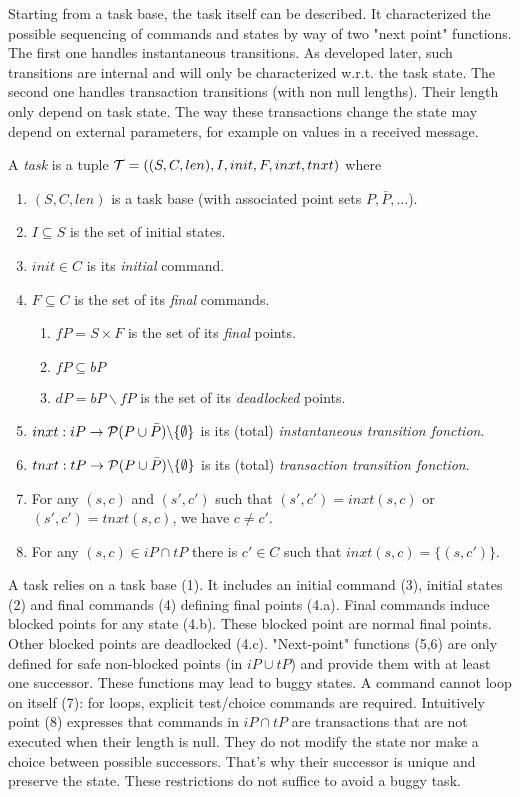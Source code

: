 \documentclass{article}
\begin{document}
Starting from a task base, the task itself can be described. It characterized the possible sequencing of commands and states by way of two "next point" functions. The first one handles instantaneous transitions. As developed later, such transitions are internal and will only be characterized w.r.t. the task state. The second one handles transaction transitions (with non null lengths). Their length only depend on task state. The way these transactions change the state may depend on external parameters, for example on values in a received message.
\begin{definition}[task]\label{def-task}
A {\em task} is a tuple ${\cal T}=((S,C,len), I, init,F,inxt,tnxt)$ where
\begin{enumerate}
\item $(S,C,len)$ is a task base (with associated point sets $P,\bar P,\ldots$).
\item $I\subseteq S$ is the set of initial states. 
\item $init\in C$ is its {\em initial} command.
\item $F\subseteq C$ is the set of its {\em final} commands.
      \begin{enumerate}
      \item $f\!P=S\times F$ is the set of its {\em final} points.
			\item $f\!P\subseteq bP$
			\item $dP=bP\backslash f\!P$ is the set of its {\em deadlocked} points.
			\end{enumerate}
\item $inxt: iP \rightarrow {\cal P}(P\cup\bar P)\backslash\{\emptyset\}$ is its (total) {\em instantaneous transition fonction}.
\item $tnxt: tP \rightarrow {\cal P}(P\cup\bar P)\backslash\{\emptyset\}$ is its (total) {\em transaction transition fonction}.
\item For any $(s,c)$ and $(s',c')$ such that $(s',c')=inxt(s,c)$ or $(s',c')=tnxt(s,c)$, we have $c\neq c'$.
\item For any $(s,c)\in iP\cap tP$ there is $c'\in C$ such that $inxt(s,c)=\{(s,c')\}$.
\end{enumerate}
\end{definition}
A task relies on a task base (1). It includes an initial command (3), initial states (2) and final commands (4) defining final points (4.a). Final commands induce blocked points for any state (4.b). These blocked point are normal final points. Other blocked points are deadlocked (4.c). "Next-point" functions (5,6) are only defined for safe non-blocked points (in $iP\cup tP$) and provide them with at least one successor. These functions may lead to buggy states. A command cannot loop on itself (7): for loops, explicit test/choice commands are required. Intuitively point (8) expresses that commands in $iP\cap tP$ are transactions that are not executed when their length is null. They do not modify the state nor make a choice between possible successors. That's why their successor is unique and preserve the state. These restrictions do not suffice to avoid a buggy task.
\end{document}
